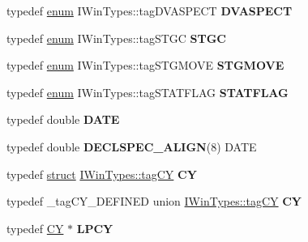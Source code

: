 \begin{DoxyCompactItemize}
\item 
\mbox{\label{interface_i_win_types_aeebd78012807ecfb42af452f5d1caba2}} 
typedef \hyperlink{interfaceenum}{enum} I\+Win\+Types\+::tag\+D\+V\+A\+S\+P\+E\+CT {\bfseries D\+V\+A\+S\+P\+E\+CT}
\item 
\mbox{\label{interface_i_win_types_a71f43d6f8abf2e49a3f66f1a33b99946}} 
typedef \hyperlink{interfaceenum}{enum} I\+Win\+Types\+::tag\+S\+T\+GC {\bfseries S\+T\+GC}
\item 
\mbox{\label{interface_i_win_types_aa28120655dbb42d49d3502179b1c46c2}} 
typedef \hyperlink{interfaceenum}{enum} I\+Win\+Types\+::tag\+S\+T\+G\+M\+O\+VE {\bfseries S\+T\+G\+M\+O\+VE}
\item 
\mbox{\label{interface_i_win_types_afc177bf7b13c25cf40ffccf6effead3d}} 
typedef \hyperlink{interfaceenum}{enum} I\+Win\+Types\+::tag\+S\+T\+A\+T\+F\+L\+AG {\bfseries S\+T\+A\+T\+F\+L\+AG}
\item 
\mbox{\label{interface_i_win_types_a779149a158b42b667587fbe7087ebc96}} 
typedef double {\bfseries D\+A\+TE}
\item 
\mbox{\label{interface_i_win_types_a5db33fee9bda9735baece6357e64253f}} 
typedef double {\bfseries D\+E\+C\+L\+S\+P\+E\+C\+\_\+\+A\+L\+I\+GN}(8) D\+A\+TE
\item 
\mbox{\label{interface_i_win_types_a9df2eca733fc972c143f671063b057f0}} 
typedef \hyperlink{interfacestruct}{struct} \hyperlink{struct_i_win_types_1_1tag_c_y}{I\+Win\+Types\+::tag\+CY} {\bfseries CY}
\item 
\mbox{\label{interface_i_win_types_aae20e5bfff173994580146e4fb831b0c}} 
typedef \+\_\+tag\+C\+Y\+\_\+\+D\+E\+F\+I\+N\+ED union \hyperlink{struct_i_win_types_1_1tag_c_y}{I\+Win\+Types\+::tag\+CY} {\bfseries CY}
\item 
\mbox{\label{interface_i_win_types_abbd31e0940afe6e5039eb83804879731}} 
typedef \hyperlink{struct_i_win_types_1_1tag_c_y}{CY} $\ast$ {\bfseries L\+P\+CY}
\item 

\end{DoxyCompactItemize}
